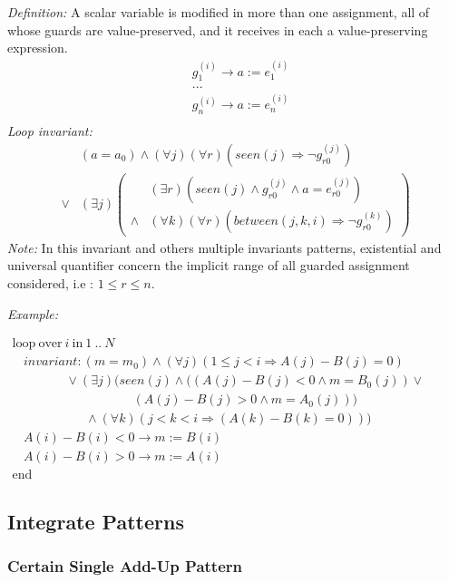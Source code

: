 \documentclass[a4paper,10pt]{article}
\newcommand{\idx}{\ensuremath{i}\xspace}
\newcommand{\at}[1]{{(#1)}}
\newcommand{\KWloop}{\ensuremath{\mathrm{loop}~}}
\newcommand{\KWend}{\ensuremath{\mathrm{end}~}}
\newcommand{\KWover}{\ensuremath{\mathrm{over}~}}
\newcommand{\KWin}{\ensuremath{~\mathrm{in}~}}
\newcommand{\impl}{\ensuremath{\Longrightarrow}}
\newcommand{\seen}[1]{\ensuremath{\mathit{seen}(#1)}\xspace}
\newcommand{\between}[3]{\ensuremath{\mathit{between}{(#1,#2,#3)}}\xspace}
\newcommand{\loopinvariant}{\noindent\textit{Loop invariant:}\xspace}
\newcommand{\patterndef}{\noindent\textit{Definition:}\xspace}
\newcommand{\patternexample}{\noindent\textit{Example:}\xspace}
\newcommand{\patternnote}{\noindent\textit{Note:}\xspace}
\begin{document}
\patterndef A scalar variable is modified in more than one assignment, all of
whose guards are value-preserved, and it receives in each a value-preserving expression.
%
\begin{eqnarray*}
&g_1^\at{\idx} \rightarrow a := e_1^\at{\idx}\\
&...\\
&g_n^\at{\idx} \rightarrow a := e_n^\at{\idx}\\
\end{eqnarray*}
%
\loopinvariant
%
\begin{eqnarray*}
&(a = a_0) \land (\forall j)(\forall r)(\seen{j} \impl \neg g_{r0}^\at{j})\\
\lor 
& (\exists j)
\left(\begin{array}{cl}
&(\exists r)(\seen{j} \land g_{r0}^\at{j} \land a = e_{r0}^\at{j})\\
\land&  (\forall k)(\forall r) (\between{j}{k}{\idx} \impl \neg g_{r0}^\at{k})
\end{array}\right)
\end{eqnarray*}
%
\patternnote In this invariant and others multiple invariants patterns, 
existential and universal quantifier concern the implicit range of all 
guarded assignment considered, i.e : $1 \leq r \leq n$.

\bigskip
\patternexample

\medskip
$\begin{array}{l}
  \KWloop \KWover i \KWin 1~..~N \\
  ~~~~ \textit{invariant}: (m = m_0) \land (\forall j)(1\leq j < i \impl A(j)-B(j)=0)\\
  ~~~~~~~~~~~~~~~~~~~ \lor (\exists j)(\seen{j} \land ((A(j)-B(j) < 0 \land m = B_0(j)) \lor\\
  ~~~~~~~~~~~~~~~~~~~~~~~~~~~~~~~~~~~~~~~~~~~ (A(j)-B(j) > 0 \land m = A_0(j)))\\
  ~~~~~~~~~~~~~~~~~~~~~~~~~~ \land (\forall k)(j < k < i \impl (A(k)-B(k) = 0)))\\
  ~~~~ A(i)-B(i) < 0 \rightarrow m := B(i)\\
  ~~~~ A(i)-B(i) > 0 \rightarrow m := A(i)\\
  \KWend
\end{array}$

\subsection{Integrate Patterns}

\subsubsection*{Certain Single Add-Up Pattern}
\end{document}
